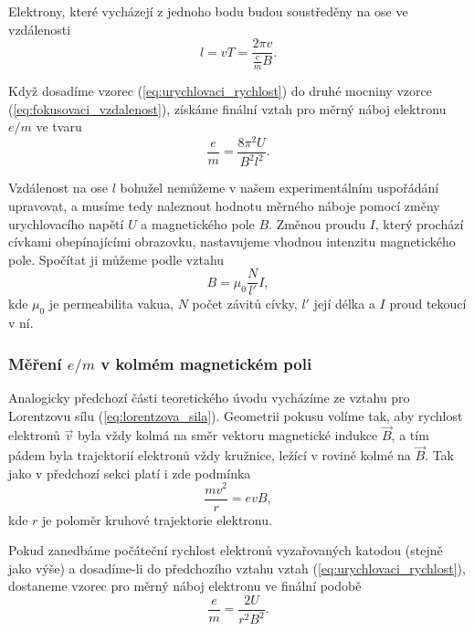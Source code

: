 \documentclass[english]{article}
\begin{document}
			Elektrony, které vycházejí z jednoho bodu budou soustředěny na ose ve vzdálenosti 
			\begin{equation} \label{eq:fokusovaci_vzdalenost}
			l = vT = \frac{2 \pi v}{\frac{e}{m} B}.
			\end{equation}
			
			Když dosadíme vzorec (\ref{eq:urychlovaci_rychlost}) do druhé mocniny vzorce (\ref{eq:fokusovaci_vzdalenost}), získáme finální vztah pro měrný náboj elektronu $e/m$ ve tvaru
			\begin{equation}
			\frac{e}{m} = \frac{8 \pi^2 U}{B^2 l^2}.
			\end{equation}
			
			Vzdálenost na ose $l$ bohužel nemůžeme v našem experimentálním uspořádání upravovat, a musíme tedy naleznout hodnotu měrného náboje pomocí změny urychlovacího napětí $U$ a magnetického pole $B$. Změnou proudu $I$, který prochází cívkami obepínajícími obrazovku, nastavujeme vhodnou intenzitu magnetického pole. Spočítat ji můžeme podle vztahu
			\begin{equation}
			B = \mu_0 \frac{N}{l'}I,
			\end{equation}
			kde $\mu_0$ je permeabilita vakua, $N$ počet závitů cívky, $l'$ její délka a $I$ proud tekoucí v ní.
			
		\subsubsection{Měření $e/m$ v kolmém magnetickém poli}
			Analogicky předchozí části teoretického úvodu vycházíme ze vztahu pro Lorentzovu sílu (\ref{eq:lorentzova_sila}). Geometrii pokusu volíme tak, aby rychlost elektronů $\vec{v}$ byla vždy kolmá na směr vektoru magnetické indukce $\vec{B}$, a tím pádem byla trajektorií elektronů vždy kružnice, ležící v rovině kolmé na $\vec{B}$. Tak jako v předchozí sekci platí i zde podmínka
			\begin{equation}
			\frac{m v^2}{r} = e v B,
			\end{equation}
			kde $r$ je poloměr kruhové trajektorie elektronu.
			
			Pokud zanedbáme počáteční rychlost elektronů vyzařovaných katodou (stejně jako výše) a dosadíme-li do předchozího vztahu vztah (\ref{eq:urychlovaci_rychlost}), dostaneme  vzorec pro měrný náboj elektronu ve finální podobě
			\begin{equation}
			\frac{e}{m} = \frac{2 U}{r^2 B^2}.
			\end{equation}
			
\end{document}
